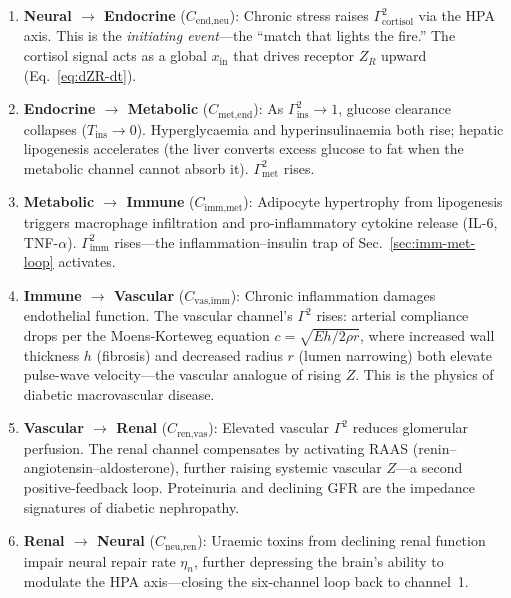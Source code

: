 \documentclass[aps,pre,twocolumn,superscriptaddress,floatfix]{revtex4-2}
\begin{document}
\begin{enumerate}
  \item \textbf{Neural $\to$ Endocrine}
    ($C_{\text{end,neu}}$):
    Chronic stress raises
    $\Gamma_{\text{cortisol}}^2$ via the HPA axis.
    This is the \emph{initiating event}---the
    ``match that lights the fire.''
    The cortisol signal acts as a global
    $x_{\text{in}}$ that drives receptor
    $Z_R$ upward (Eq.~\ref{eq:dZR-dt}).

  \item \textbf{Endocrine $\to$ Metabolic}
    ($C_{\text{met,end}}$):
    As $\Gamma_{\text{ins}}^2 \to 1$,
    glucose clearance collapses
    ($T_{\text{ins}} \to 0$).
    Hyperglycaemia and
    hyperinsulinaemia both rise;
    hepatic lipogenesis accelerates
    (the liver converts excess glucose
    to fat when the metabolic channel
    cannot absorb it).
    $\Gamma_{\text{met}}^2$ rises.

  \item \textbf{Metabolic $\to$ Immune}
    ($C_{\text{imm,met}}$):
    Adipocyte hypertrophy from lipogenesis
    triggers macrophage infiltration and
    pro-inflammatory cytokine release
    (IL-6, TNF-$\alpha$).
    $\Gamma_{\text{imm}}^2$ rises---the
    inflammation--insulin trap of
    Sec.~\ref{sec:imm-met-loop} activates.

  \item \textbf{Immune $\to$ Vascular}
    ($C_{\text{vas,imm}}$):
    Chronic inflammation damages endothelial
    function.
    The vascular channel's $\Gamma^2$ rises:
    arterial compliance drops per the
    Moens-Korteweg equation
    $c = \sqrt{Eh/2\rho r}$,
    where increased wall thickness $h$
    (fibrosis) and decreased radius $r$
    (lumen narrowing) both elevate
    pulse-wave velocity---the vascular
    analogue of rising $Z$.
    This is the physics of diabetic
    macrovascular disease.

  \item \textbf{Vascular $\to$ Renal}
    ($C_{\text{ren,vas}}$):
    Elevated vascular $\Gamma^2$ reduces
    glomerular perfusion.
    The renal channel compensates by
    activating RAAS
    (renin--angiotensin--aldosterone),
    further raising systemic vascular $Z$---a
    second positive-feedback loop.
    Proteinuria and declining GFR
    are the impedance signatures of
    diabetic nephropathy.

  \item \textbf{Renal $\to$ Neural}
    ($C_{\text{neu,ren}}$):
    Uraemic toxins from declining renal function
    impair neural repair rate $\eta_n$,
    further depressing the brain's ability
    to modulate the HPA axis---closing the
    six-channel loop back to channel~1.
\end{enumerate}
\end{document}
